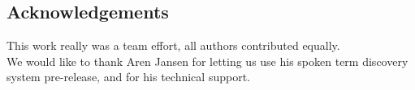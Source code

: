 \documentclass[final]{beamer}
\begin{document}
\begin{frame}[t]
\begin{multicols}{3}
\section{Acknowledgements}

This work really was a team effort, all authors contributed equally.\\
We would like to thank Aren Jansen for letting us use his spoken term discovery system pre-release, and for his technical support.


\end{multicols}

\end{frame}
\end{document}
